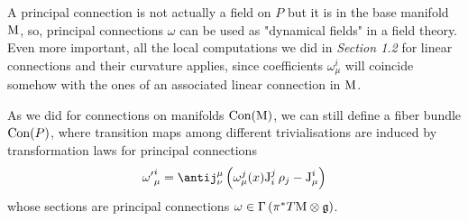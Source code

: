 \begin{remark}\label{forward}
    A principal connection is not actually a field on $P$ but it is in the base manifold \,$\text{\normalfont M}$, so, principal connections $\omega$ can be used as "dynamical fields" in a field theory. Even more important, all the local computations we did in \emph{Section 1.2} for linear connections and their curvature applies, since coefficients $\omega^i_\mu$ will coincide somehow with the ones of an associated linear connection in $\text{\normalfont M}$.

\end{remark}

As we did for connections on manifolds $\text{\normalfont Con}(\text{\normalfont M})$, we can still define a fiber bundle $\text{\normalfont Con}(P)$, where transition maps among different trivialisations are induced by transformation laws for principal connections 
\begin{equation}\label{prinConn_laws}
    {\omega'}^i_\mu=\antij^\mu_\nu\left(\omega^j_\mu(x)\J^j_i\,\rho_j-\J^i_\mu\right)
\end{equation}
whose sections are principal connections $\omega\in\Gamma\left(\pi^*T\text{\normalfont M}\otimes\mathfrak{g}\right)$.

